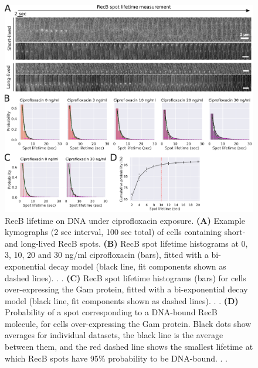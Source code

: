 \begin{figure}[htbp]
    \centering
    \includegraphics[width=.8\textwidth]{Figures/Fig2_RecB_lifetime.pdf}
    \caption{RecB lifetime on DNA under ciprofloxacin exposure. \textbf{(A)} Example kymographs (2 sec interval, 100 sec total) of cells containing short- and long-lived RecB spots. \textbf{(B)} RecB spot lifetime histograms at 0, 3, 10, 20 and 30 ng/ml ciprofloxacin (bars), fitted with a bi-exponential decay model (black line, fit components shown as dashed lines). . . \textbf{(C)} RecB spot lifetime histograms (bars) for cells over-expressing the Gam protein, fitted with a bi-exponential decay model (black line, fit components shown as dashed lines). . . \textbf{(D)} Probability of a spot corresponding to a DNA-bound RecB molecule, for cells over-expressing the Gam protein. Black dots show averages for individual datasets, the black line is the average between them, and the red dashed line shows the smallest lifetime at which RecB spots have 95\% probability to be DNA-bound. . .}
    \label{Fig:lifetimes}
\end{figure}

